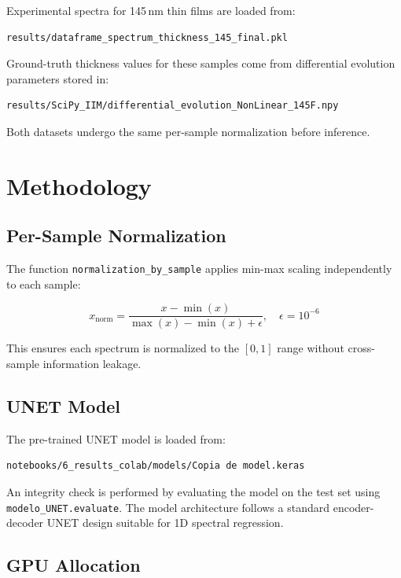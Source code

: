 \documentclass[11pt,a4paper]{article}
\begin{document}
Experimental spectra for 145\,nm thin films are loaded from:

\begin{verbatim}
results/dataframe_spectrum_thickness_145_final.pkl
\end{verbatim}

Ground-truth thickness values for these samples come from differential evolution parameters stored in:

\begin{verbatim}
results/SciPy_IIM/differential_evolution_NonLinear_145F.npy
\end{verbatim}

Both datasets undergo the same per-sample normalization before inference.

\section{Methodology}

\subsection{Per-Sample Normalization}

The function \texttt{normalization\_by\_sample} applies min-max scaling independently to each sample:

\[
x_{\text{norm}} = \frac{x - \min(x)}{\max(x) - \min(x) + \epsilon}, \quad \epsilon = 10^{-6}
\]

This ensures each spectrum is normalized to the $[0, 1]$ range without cross-sample information leakage.

\subsection{UNET Model}

The pre-trained UNET model is loaded from:

\begin{verbatim}
notebooks/6_results_colab/models/Copia de model.keras
\end{verbatim}

An integrity check is performed by evaluating the model on the test set using \texttt{modelo\_UNET.evaluate}. The model architecture follows a standard encoder-decoder UNET design suitable for 1D spectral regression.

\subsection{GPU Allocation}
\end{document}
